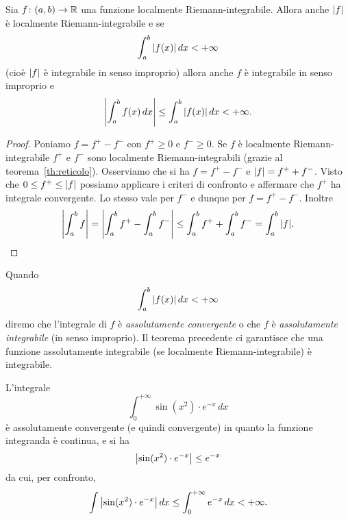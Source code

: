 \begin{theorem}
\label{th:convergenza_assoluta_integrale}
\mymark{**}%
Sia $f\colon (a,b)\to {\mathbb R}$ una funzione localmente Riemann-integrabile.
Allora anche ${\left|f\right|}$ è localmente Riemann-integrabile e se
\[
\int_a^b {\left|f(x)\right|}\, dx < +\infty
\]
(cioè ${\left|f\right|}$ è integrabile in senso improprio)
allora anche $f$ è integrabile in senso improprio e
\[
  {\left|\int_a^b f(x)\,dx\right|}
  \le \int_a^b {\left|f(x)\right|}\, dx < +\infty.
\]
\end{theorem}
%
%
\begin{proof}
Poniamo $f = f^+ - f^-$ con $f^+\ge 0$ e $f^-\ge 0$.
Se $f$ è localmente Riemann-integrabile
$f^+$ e $f^-$ sono localmente Riemann-integrabili
(grazie al teorema~\ref{th:reticolo}).
Osserviamo che si ha $f = f^+ - f^-$
e ${\left|f\right|} = f^+ + f^-$.
Visto che $0\le f^+ \le {\left|f\right|}$ possiamo
applicare i criteri di confronto e
affermare che $f^+$ ha integrale convergente.
Lo stesso vale per $f^-$ e dunque per $f=f^+ - f^-$.
Inoltre
\[
  {\left|\int_a^b f \right|}
  = {\left|\int_a^b f^+ - \int_a^b f^-\right|}
  \le \int_a^b f^+ + \int_a^b f^-
  = \int_a^b {\left|f\right|}.
\]
\end{proof}

\begin{definition}
%
%
%
%
%
Quando
\[
  \int_a^b {\left|f(x)\right|}\, dx <+\infty
\]
diremo che l'integrale di $f$ è \emph{assolutamente convergente}
o che $f$ è \emph{assolutamente integrabile} (in senso improprio).
Il teorema
precedente ci garantisce che una funzione assolutamente integrabile
(se localmente Riemann-integrabile) è integrabile.
\end{definition}

\begin{example}
L'integrale
\[
  \int_0^{+\infty} \sin(x^2)\cdot e^{-x}\, dx
\]
è assolutamente convergente (e quindi convergente)
in quanto la funzione integranda è continua,
e si ha
\[
 {\left|\sin(x^2)\cdot e^{-x}\right|} \le e^{-x}
\]
da cui, per confronto,
\[
 \int {\left|\sin(x^2)\cdot e^{-x}\right|}\, dx  \le
  \int_0^{+\infty} e^{-x}\, dx < +\infty.
\]
\end{example}

